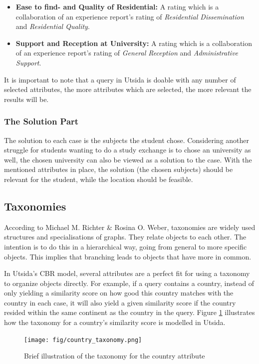 \begin{itemize}
\item \textbf{Ease to find- and Quality of Residential:} A rating which is a collaboration of an experience report's rating of \emph{Residential Dissemination} and \emph{Residential Quality}.

\item \textbf{Support and Reception at University:} A rating which is a collaboration of an experience report's rating of \emph{General Reception} and \emph{Administrative Support}.
\end{itemize}

It is important to note that a query in Utsida is doable with any number of selected attributes, the more attributes which are selected, the more relevant the results will be. 


\subsubsection{The Solution Part}
The solution to each case is the subjects the student chose. Considering another struggle for students wanting to do a study exchange is to chose an university as well, the chosen university can also be viewed as a solution to the case. With the mentioned attributes in place, the solution (the chosen subjects) should be relevant for the student, while the location should be feasible. 

\subsection{Taxonomies}
According to Michael M. Richter & Rosina O. Weber\cite{richter2013case}, taxonomies are widely used structures and specialisations of graphs. They relate
objects to each other. The intention is to do this in a hierarchical way, going from
general to more specific objects. This implies that branching leads to objects that
have more in common. 

In Utsida's CBR model, several attributes are a perfect fit for using a taxonomy to organize objects directly. For example, if a query contains a country, instead of only yielding a similarity score on how good this country matches with the country in each case, it will also yield a given similarity score if the country resided within the same continent as the country in the query. Figure \ref{fig:country_taxonomy} illustrates how the taxonomy for a country's similarity score is modelled in Utsida.

\begin{figure}[H]
    \centering
    \texttt{[image: fig/country\_taxonomy.png]}
    \caption{Brief illustration of the taxonomy for the country attribute}
    \label{fig:country_taxonomy}
\end{figure}

